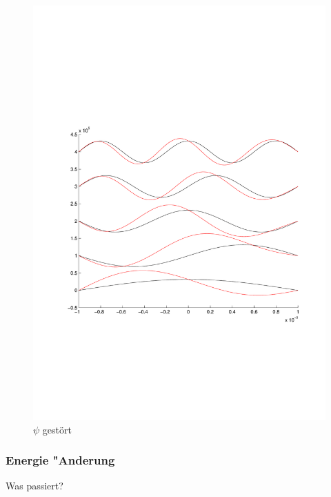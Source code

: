 \begin{refsection}
\begin{figure}
 \centering
 \includegraphics[width=12cm,clip=true,trim=2cm 7cm 1cm 8cm]{efeld/Psi_gestoert.pdf}
 \caption{$\psi$ gest\"ort}
 \label{abb:efeld_psi_gestoert}
\end{figure}




\subsubsection{Energie "Anderung}

Was passiert?


\end{refsection}

